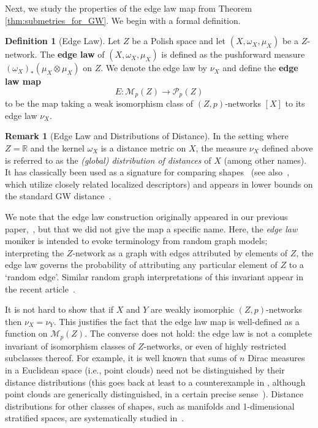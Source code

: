 \documentclass{article}
\theoremstyle{definition}
\newtheorem{definition}[proposition]{Definition}
\newtheorem{remark}[proposition]{Remark}
\newcommand{\R}{\mathbb{R}}
\newcommand{\M}{\mathcal{M}}
\newcommand{\MZp}{\M_p(Z)}
\newcommand{\WZ}{\mathcal{P}_p(Z)}
\begin{document}
Next, we study the properties of the edge law map from Theorem \ref{thm:submetries_for_GW}. We begin with a formal definition.

\begin{definition}[Edge Law]
    \label{def:edge_law} Let $Z$ be a Polish space and let $(X,\omega_X,\mu_X)$ be a $Z$-network. The \textbf{edge law} of $(X,\omega_X,\mu_X)$ is defined as the pushforward measure $(\omega_X)_*(\mu_X \otimes \mu_X)$ on $Z$. We denote the edge law by $\nu_X$ and define the \textbf{edge law map}
    \[
    E:\MZp \to \WZ
    \]
    to be the map taking a weak isomorphism class of $(Z,p)$-networks $[X]$ to its edge law $\nu_X$. 
\end{definition}


%
%
%
%
%
%
%
%
%

%
%
%
%
%
%
%
%
%
%
%
%
%
%
%
%
%
%
%
%
%
%
%
%
%
%
%
%
%
%
%
%
%
%
%
%
%
%
%
%
%

\begin{remark}[Edge Law and Distributions of Distance]
    In the setting where $Z = \R$ and the kernel $\omega_X$ is a distance metric on $X$, the measure $\nu_X$ defined above is referred to as the  \emph{(global) distribution of distances} of $X$ (among other names). It has classically been used as a signature for comparing shapes~\cite{osada2002shape} (see also~\cite{pottmann2009integral,manay2006integral,belongie2002shape}, which utilize closely related localized descriptors) and appears in lower bounds on the standard GW distance~\cite{Memoli_2007,Memoli2011GromovWasserstein,memoli2022distance}. 
    
    We note that the edge law construction originally appeared in our previous paper,~\cite[Section 5.1]{bauer2025zgromovwassersteindistance}, but that we did not give the map a specific name. Here, the \emph{edge law} moniker is intended to evoke terminology from random graph models; interpreting the $Z$-network as a graph with edges attributed by elements of $Z$, the edge law governs the probability of attributing any particular element of $Z$ to a `random edge'. Similar random graph interpretations of this invariant appear in the recent article~\cite{gomez2025metrics}. 
    
    It is not hard to show that if $X$ and $Y$ are weakly isomorphic $(Z,p)$-networks then $\nu_X = \nu_Y$. This justifies the fact that the edge law map is well-defined as a function on $\MZp$. The converse does not hold: the edge law is not a complete invariant of isomorphism classes of $Z$-networks, or even of highly restricted subclasses thereof. For example, it is well known that sums of $n$ Dirac measures in a Euclidean space (i.e., point clouds) need not be distinguished by their distance distributions (this goes back at least to a counterexample in \cite{bloom1977counterexample},  although point clouds are generically distinguished, in a certain precise sense~\cite{boutin2004reconstructing}). Distance distributions for other classes of shapes, such as manifolds and 1-dimensional stratified spaces, are systematically studied in~\cite{memoli2022distance}.
\end{remark}
\end{document}
